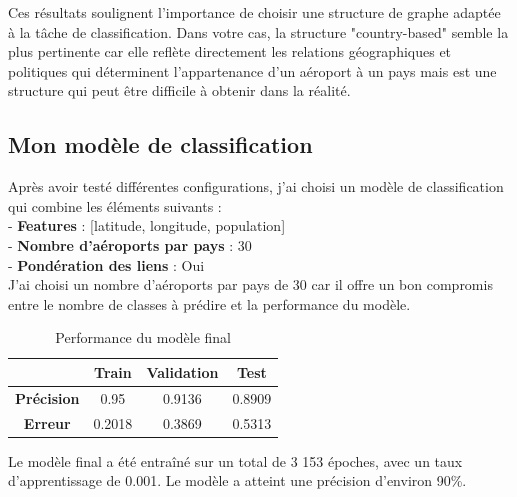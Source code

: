 Ces résultats soulignent l'importance de choisir une structure de graphe
adaptée à la tâche de classification. Dans votre cas, la structure
"country-based" semble la plus pertinente car elle reflète directement les
relations géographiques et politiques qui déterminent l'appartenance d'un
aéroport à un pays mais est une structure qui peut être difficile à obtenir
dans la réalité.\\

\subsection{Mon modèle de classification}

Après avoir testé différentes configurations, j'ai choisi un modèle de
classification qui combine les éléments suivants : \\ - \textbf{Features} :
[latitude, longitude, population] \\ - \textbf{Nombre d'aéroports par pays} :
30 \\ - \textbf{Pondération des liens} : Oui \\

J'ai choisi un nombre d'aéroports par pays de 30 car il offre un bon compromis
entre le nombre de classes à prédire et la performance du modèle.\\

\begin{table}[h!]
    \centering
    \begin{tabular}{|c|c|c|c|}
        \hline
                           & \textbf{Train} & \textbf{Validation} & \textbf{Test} \\ \hline \hline
        \textbf{Précision} & 0.95           & 0.9136              & 0.8909        \\ \hline
        \textbf{Erreur}    & 0.2018         & 0.3869              & 0.5313        \\ \hline
    \end{tabular}
    \caption{Performance du modèle final}
\end{table}

Le modèle final a été entraîné sur un total de 3 153 époches, avec un taux d'apprentissage de 0.001.
Le modèle a atteint une précision d'environ 90\%.\\


